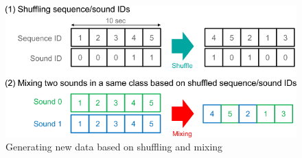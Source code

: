 \begin{figure}[htbp]
	\centering
	\includegraphics[scale=0.5]{img/DCASE_data_augmentation.png}
	\caption[Generating new data based on shuffling and mixing]{Generating new data based on shuffling and mixing \footnotemark}
	\label{fig:DCASE-Data-Augmentation}
\end{figure}

